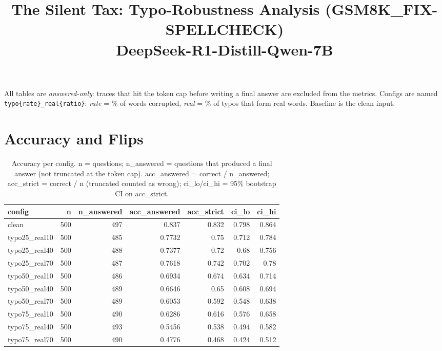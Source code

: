 \documentclass[11pt]{article}
\title{The Silent Tax: Typo-Robustness Analysis (GSM8K\_FIX-SPELLCHECK)\\\large DeepSeek-R1-Distill-Qwen-7B}
\date{}
\begin{document}
\maketitle
\noindent All tables are \emph{answered-only}: traces that hit the token cap before writing a final answer are excluded from the metrics. Configs are named \texttt{typo\{rate\}\_real\{ratio\}}: \emph{rate} = \% of words corrupted, \emph{real} = \% of typos that form real words. Baseline is the clean input.

\section*{Accuracy and Flips}
\begin{table}[H]
\centering
\caption{Accuracy per config. n = questions; n\_answered = questions that produced a final answer (not truncated at the token cap). acc\_answered = correct / n\_answered; acc\_strict = correct / n (truncated counted as wrong); ci\_lo/ci\_hi = 95\% bootstrap CI on acc\_strict.}
\small
\begin{adjustbox}{max width=\textwidth}
\begin{tabular}{lrrrrrr}
\toprule
\textbf{config} & \textbf{n} & \textbf{n\_answered} & \textbf{acc\_answered} & \textbf{acc\_strict} & \textbf{ci\_lo} & \textbf{ci\_hi} \\
\midrule
clean & 500 & 497 & 0.837 & 0.832 & 0.798 & 0.864 \\
typo25\_real10 & 500 & 485 & 0.7732 & 0.75 & 0.712 & 0.784 \\
typo25\_real40 & 500 & 488 & 0.7377 & 0.72 & 0.68 & 0.756 \\
typo25\_real70 & 500 & 487 & 0.7618 & 0.742 & 0.702 & 0.78 \\
typo50\_real10 & 500 & 486 & 0.6934 & 0.674 & 0.634 & 0.714 \\
typo50\_real40 & 500 & 489 & 0.6646 & 0.65 & 0.608 & 0.694 \\
typo50\_real70 & 500 & 489 & 0.6053 & 0.592 & 0.548 & 0.638 \\
typo75\_real10 & 500 & 490 & 0.6286 & 0.616 & 0.576 & 0.658 \\
typo75\_real40 & 500 & 493 & 0.5456 & 0.538 & 0.494 & 0.582 \\
typo75\_real70 & 500 & 490 & 0.4776 & 0.468 & 0.424 & 0.512 \\
\bottomrule
\end{tabular}
\end{adjustbox}
\end{table}
\end{document}
